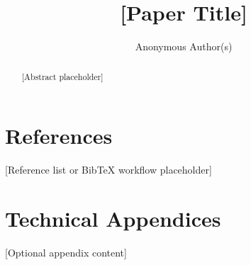\documentclass{article}
\title{[Paper Title]}
\author{Anonymous Author(s)}
\begin{document}
\maketitle

\begin{abstract}
[Abstract placeholder]
\end{abstract}








\section*{References}

{\small
[Reference list or BibTeX workflow placeholder]
}

\appendix

\section{Technical Appendices}
[Optional appendix content]

\newpage

\end{document}
